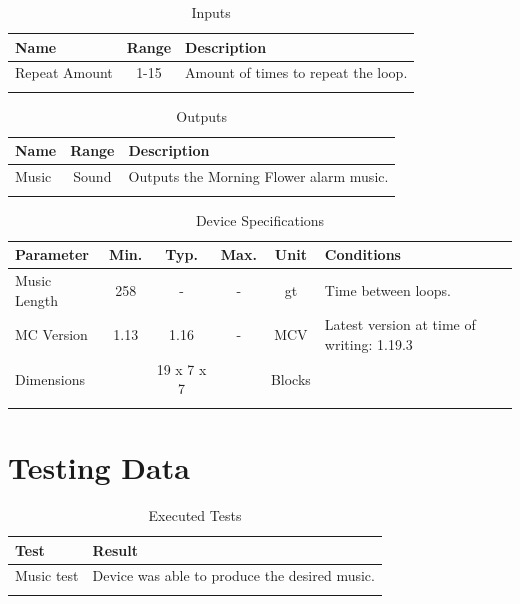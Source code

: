 \documentclass[10pt]{datasheet}
\begin{document}
\begin{table}[h]
    \caption{Inputs}
    \begin{tabularx}{\textwidth}{l | c | X}
        \thickhline
        \textbf{Name} & \textbf{Range} & \textbf{Description} \\
        \hline
        Repeat Amount & 1-15 & Amount of times to repeat the loop. \\
        \thickhline
\end{tabularx}
\end{table}

\begin{table}[h]
    \caption{Outputs}
    \begin{tabularx}{\textwidth}{l | c | X}
        \thickhline
        \textbf{Name} & \textbf{Range} & \textbf{Description} \\
        \hline
        Music & Sound & Outputs the Morning Flower alarm music. \\
        \thickhline
\end{tabularx}
\end{table}

\begin{table}[h]
    \caption{Device Specifications}
    \begin{tabularx}{\textwidth}{l | c c c | c | X}
        \thickhline
        \textbf{Parameter} & \textbf{Min.} & \textbf{Typ.} & \textbf{Max.} &
        \textbf{Unit} & \textbf{Conditions} \\
        \hline
        Music Length & 258 & - & - & gt & Time between loops. \\
        \hline
        MC Version & 1.13 & 1.16 & - & MCV & Latest version at time of writing: 1.19.3\\
        \hline
        Dimensions & & 19 x 7 x 7 & & Blocks & \\
        \thickhline
\end{tabularx}
\end{table}
\newpage
\section{Testing Data}
\begin{table}[h]
\caption{Executed Tests}
\begin{tabularx}{\textwidth}{l | X}
    \thickhline
    \textbf{Test} & \textbf{Result} \\
    \hline
    Music test & Device was able to produce the desired music. \\
    \thickhline
\end{tabularx}
\end{table}
\end{document}
